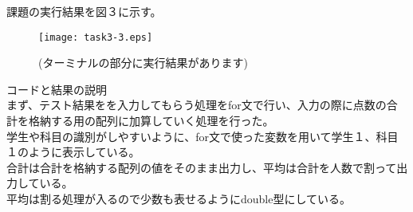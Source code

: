 \documentclass[a4j]{jsarticle}
\begin{document}
課題の実行結果を図３に示す。\\

\begin{figure}[htbp]
  \centering
  \texttt{[image: task3-3.eps]}
  \caption{(ターミナルの部分に実行結果があります)}
  \label{fig:sample}
\end{figure}

\textmd{コードと結果の説明} \\

まず、テスト結果をを入力してもらう処理をfor文で行い、入力の際に点数の合計を格納する用の配列に加算していく処理を行った。 \\
学生や科目の識別がしやすいように、for文で使った変数を用いて学生１、科目１のように表示している。 \\
合計は合計を格納する配列の値をそのまま出力し、平均は合計を人数で割って出力している。  \\
平均は割る処理が入るので少数も表せるようにdouble型にしている。  \\
\end{document}
